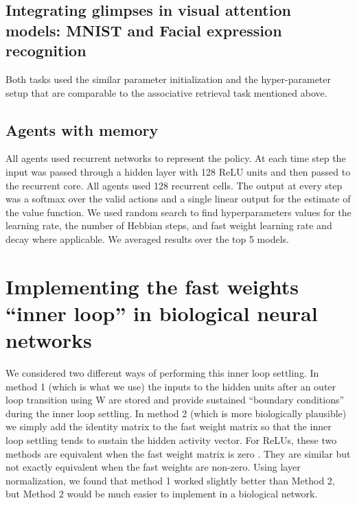 \documentclass{article}
\begin{document}
\subsection{Integrating glimpses in visual attention models: MNIST and Facial expression recognition}

Both tasks used the similar parameter initialization and the hyper-parameter setup that are comparable to the associative retrieval task mentioned above.

\subsection{Agents with memory}

All agents used recurrent networks to represent the policy. At each time step
the input was passed through a hidden layer with 128 ReLU units and then passed
to the recurrent core. All agents used 128 recurrent cells. The output at every
step was a softmax over the valid actions and a single linear output for the
estimate of the value function. We used random search to find hyperparameters
values for the learning rate, the number of Hebbian steps, and fast weight
learning rate and decay where applicable.  We averaged results over the top 5
models.

\section{Implementing the fast weights ``inner loop'' in biological neural networks}

We considered two different ways of performing this inner loop settling. In method 1 (which is what we use) the inputs to the hidden units after an outer loop transition using W are stored and provide sustained “boundary conditions” during the inner loop settling. In method 2 (which is more biologically plausible)  we simply add the identity matrix to the fast weight matrix so that the inner loop settling tends to sustain the hidden activity vector. For ReLUs, these two methods are equivalent when the fast weight matrix is zero . They are similar but not exactly equivalent when the fast weights are non-zero. Using layer normalization, we found that method 1 worked slightly better than Method 2, but Method 2 would be much easier to implement in a biological network. 
\end{document}

